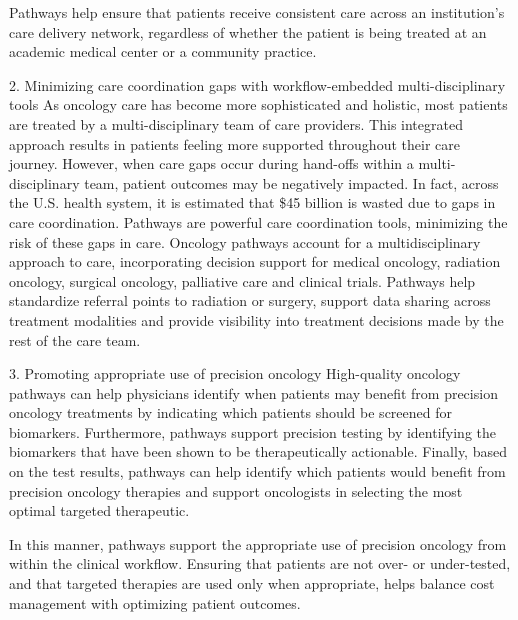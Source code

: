 Pathways help ensure that patients receive consistent care across an
institution's care delivery network, regardless of whether the patient is being
treated at an academic medical center or a community practice.

2. Minimizing care coordination gaps with workflow-embedded multi-disciplinary
tools
As oncology care has become more sophisticated and holistic, most patients
are treated by a multi-disciplinary team of care providers. This integrated
approach results in patients feeling more supported throughout their care
journey. However, when care gaps occur during hand-offs within a
multi-disciplinary team, patient outcomes may be negatively impacted. In fact,
across the U.S. health system, it is estimated that \$45 billion is wasted due
to gaps in care coordination. Pathways are powerful care coordination tools,
minimizing the risk of these gaps in care. Oncology pathways account for a
multidisciplinary approach to care, incorporating decision support for medical
oncology, radiation oncology, surgical oncology, palliative care and clinical
trials. Pathways help standardize referral points to radiation or surgery,
support data sharing across treatment modalities and provide visibility into
treatment decisions made by the rest of the care team.

3. Promoting appropriate use of precision oncology
High-quality oncology
pathways can help physicians identify when patients may benefit from precision
oncology treatments by indicating which patients should be screened for
biomarkers. Furthermore, pathways support precision testing by identifying the
biomarkers that have been shown to be therapeutically actionable. Finally, based
on the test results, pathways can help identify which patients would benefit
from precision oncology therapies and support oncologists in selecting the most
optimal targeted therapeutic.

In this manner, pathways support the appropriate use of precision oncology from
within the clinical workflow. Ensuring that patients are not over- or
under-tested, and that targeted therapies are used only when appropriate, helps
balance cost management with optimizing patient outcomes.

